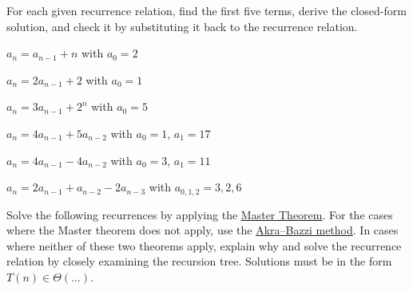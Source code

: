 \documentclass[a4paper,12pt]{article}
\begin{document}

\begin{tasks}
    \item For each given recurrence relation, find the first five terms, derive the closed-form solution, and check it by substituting it back to the recurrence relation.

    \begin{multicols}{2}
    \begin{subtasks}

        \item $a_n = a_{n-1} + n$ with $a_0 = 2$

        \item $a_n = 2a_{n-1} + 2$ with $a_0 = 1$

        \item $a_n = 3a_{n-1} + 2^n$ with $a_0 = 5$

        \item $a_n = 4a_{n-1} + 5a_{n-2}$ with $a_0 = 1$, $a_1 = 17$

        \item $a_n = 4a_{n-1} - 4a_{n-2}$ with $a_0 = 3$, $a_1 = 11$

        \item $a_n = 2a_{n-1} + a_{n-2} - 2a_{n-3}$ with $a_{0,1,2} = 3,2,6$
    \end{subtasks}
    \end{multicols}


    \item Solve the following recurrences by applying the \href{https://en.wikipedia.org/wiki/Master_theorem_(analysis_of_algorithms)}{Master Theorem}.
    For the cases where the Master theorem does not apply, use the \href{https://en.wikipedia.org/wiki/Akra-Bazzi_method}{Akra--Bazzi method}.
    In cases where neither of these two theorems apply, explain why and solve the recurrence relation by closely examining the recursion tree.
    Solutions must be in the form $T(n) \in \Theta(\dots)$.


\end{tasks}
\end{document}
